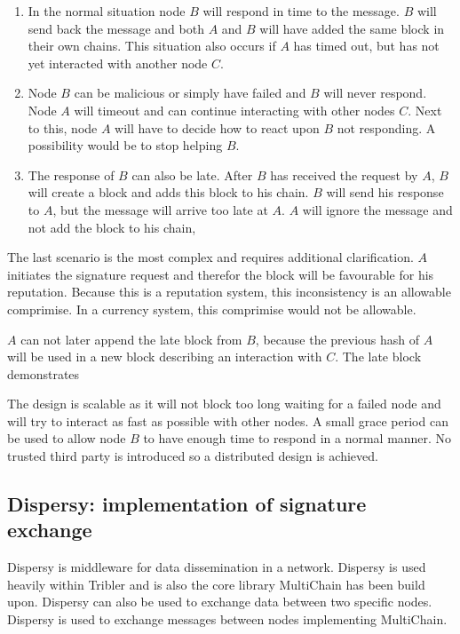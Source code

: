 \begin{enumerate}
\item
In the normal situation node $B$ will respond in time to the message.
$B$ will send back the message
and both $A$ and $B$ will have added the same block in their own chains.
This situation also occurs if $A$ has timed out,
but has not yet interacted with another node $C$.

\item
Node $B$ can be malicious or simply have failed and $B$ will never respond.
Node $A$ will timeout and can continue interacting with other nodes $C$.
Next to this, node $A$ will have to decide how to react upon $B$ not responding.
A possibility would be to stop helping $B$.

\item
The response of $B$ can also be late.
After $B$ has received the request by $A$,
$B$ will create a block and adds this block to his chain.
$B$ will send his response to $A$,
but the message will arrive too late at $A$.
$A$ will ignore the message and not add the block to his chain,
\end{enumerate}

The last scenario is the most complex and requires additional clarification.
$A$ initiates the signature request and therefor the block will be favourable for his reputation.
Because this is a reputation system, this inconsistency is an allowable comprimise.
In a currency system, this comprimise would not be allowable.

$A$ can not later append the late block from $B$,
because the previous hash of $A$ will be used in a new block describing an interaction with $C$.
The late block demonstrates 

The design is scalable as it will not block too long waiting for a failed node 
and will try to interact as fast as possible with other nodes.
A small grace period can be used to allow node $B$ to have enough time to respond in a normal manner.
No trusted third party is introduced so a distributed design is achieved.

\subsection{Dispersy: implementation of signature exchange}
Dispersy is middleware for data dissemination in a network.
Dispersy is used heavily within Tribler
and is also the core library MultiChain has been build upon.
Dispersy can also be used to exchange data between two specific nodes.
Dispersy is used to exchange messages between nodes implementing MultiChain.

